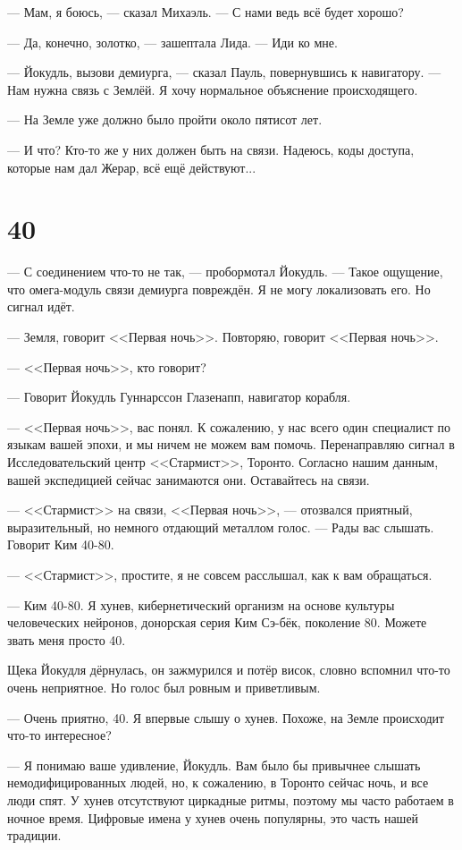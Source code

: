 \documentclass[a4paper,10pt,fleqn]{book}\usepackage{polyglossia}\setdefaultlanguage{english}\setotherlanguage{russian}\defaultfontfeatures{Ligatures=TeX,Mapping=tex-text}\usepackage{xcolor}\definecolor{lightgray}{HTML}{bbbbbb}\color{lightgray}\newcommand{\ml}[3]{\textcolor{black}{#3}}
\newcommand{\asterism}{\vspace{1em}{\centering\Large\bfseries$\ast~\ast~\ast$\par}\vspace{1em}}
\begin{document}
--- Мам, я боюсь, --- сказал Михаэль.
--- С нами ведь всё будет хорошо?

--- Да, конечно, золотко, --- зашептала Лида.
--- Иди ко мне.

--- Йокудль, вызови демиурга, --- сказал Пауль, повернувшись к навигатору.
--- Нам нужна связь с Землёй.
Я хочу нормальное объяснение происходящего.

--- На Земле уже должно было пройти около пятисот лет.

--- И что?
Кто-то же у них должен быть на связи.
Надеюсь, коды доступа, которые нам дал Жерар, всё ещё действуют...

\section{40}

--- С соединением что-то не так, --- пробормотал Йокудль.
--- Такое ощущение, что омега-модуль связи демиурга повреждён.
Я не могу локализовать его.
Но сигнал идёт.

\asterism

--- Земля, говорит <<Первая ночь>>.
Повторяю, говорит <<Первая ночь>>.

--- <<Первая ночь>>, кто говорит?

--- Говорит Йокудль Гуннарссон Глазенапп, навигатор корабля.

--- <<Первая ночь>>, вас понял.
К сожалению, у нас всего один специалист по языкам вашей эпохи, и мы ничем не можем вам помочь.
Перенаправляю сигнал в Исследовательский центр <<Стармист>>, Торонто.
Согласно нашим данным, вашей экспедицией сейчас занимаются они.
Оставайтесь на связи.

--- <<Стармист>> на связи, <<Первая ночь>>, --- отозвался приятный, выразительный, но немного отдающий металлом голос.
--- Рады вас слышать.
Говорит Ким 40-80.

--- <<Стармист>>, простите, я не совсем расслышал, как к вам обращаться.

--- Ким 40-80.
Я хунев, кибернетический организм на основе культуры человеческих нейронов, донорская серия Ким Сэ-бёк, поколение 80. %
Можете звать меня просто 40.

Щека Йокудля дёрнулась, он зажмурился и потёр висок, словно вспомнил что-то очень неприятное.
Но голос был ровным и приветливым.

--- Очень приятно, 40.
Я впервые слышу о хунев.
Похоже, на Земле происходит что-то интересное?

--- Я понимаю ваше удивление, Йокудль.
Вам было бы привычнее слышать немодифицированных людей, но, к сожалению, в Торонто сейчас ночь, и все люди спят.
У хунев отсутствуют циркадные ритмы, поэтому мы часто работаем в ночное время.
Цифровые имена у хунев очень популярны, это часть нашей традиции.
\end{document}
